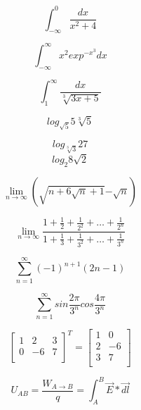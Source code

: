 \documentclass[12pt, letterpaper, titlepage]{article}
\begin{document}
$$
\int_{-\infty}^0 \frac{dx}{x^2 + 4}
$$

$$
\int_{-\infty}^\infty {x^2} {exp^{-x^3}} dx
$$

$$
\int_1^\infty \frac{dx}{\sqrt[3]{3x+5}}
$$

$$
log_{\sqrt{5}} 5 \sqrt[3]{5}
$$

$$
log_{\sqrt[3]{3}} 27
$$
$$
log_2 8 \sqrt{2}
$$

$$ 
\lim_{n \to\infty}\left( \sqrt{n+6\sqrt{n}+1}{ - \sqrt{n}}\right)
$$

$$ 
\lim_{n \to\infty} \frac{1+\frac{1}{2}+\frac{1}{2^2}+\ldots+\frac{1}{2^n}}{1+\frac{1}{3}+\frac{1}{3^2}+\ldots+\frac{1}{3^n}}
$$

$$
\sum_{n=1}^{\infty} \left(-1\right)^{n+1}\left( 2n-1\right)
$$

$$
\sum_{n=1}^{\infty} sin\frac{2\pi}{3^n}cos\frac{4\pi}{3^n}
$$

$$
\left[
\begin{array}{clc}
1&2&3\\
0&-6&7\\

\end{array}
\right]^T
=
\left[
\begin{array}{cl}
1&0\\
2&-6\\
3&7\\
\end{array}
\right]
$$

$$
U_{AB} = \frac{W_{A \rightarrow B}}{q}= \int_A^B \vec{E}*\vec{dl}
$$
\end{document}
